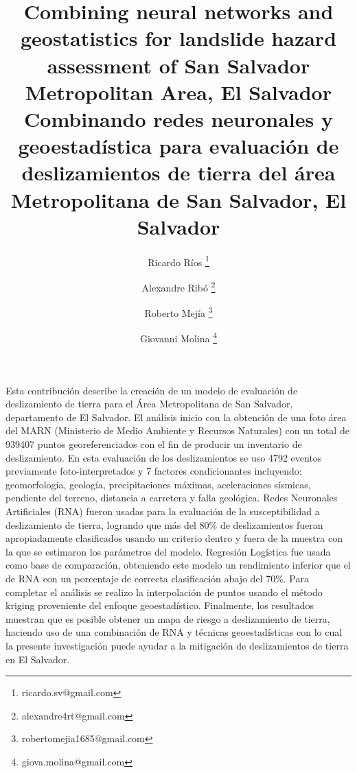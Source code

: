 \documentclass[11pt,twoside]{rmta2010esp}%
\begin{document}
\title{Combining neural networks and geostatistics for landslide hazard assessment of San Salvador Metropolitan Area, El Salvador 
\newline
\newline
Combinando redes neuronales y geoestad\'{i}stica para evaluaci\'{o}n de deslizamientos de tierra del \'{a}rea Metropolitana de San Salvador, El Salvador}

\author[1]{Ricardo R\'{i}os \thanks{ricardo.sv@gmail.com}}
\author[2]{Alexandre Rib\'{o} \thanks{alexandre4rt@gmail.com}}
\author[3]{Roberto Mej\'{i}a \thanks{robertomejia1685@gmail.com}}
\author[4]{Giovanni Molina \thanks{giova.molina@gmail.com}}




\maketitle



\begin{resumen}
Esta contribuci\'{o}n describe la creaci\'{o}n de un modelo de evaluaci\'{o}n de deslizamiento de tierra para el \'{A}rea Metropolitana de San Salvador, departamento de El Salvador. El an\'{a}lisis inicio con la obtenci\'{o}n de una foto \'{a}rea del MARN (Ministerio de Medio Ambiente y Recursos Naturales) con un total de 939407 puntos georeferenciados con el fin de producir un inventario de deslizamiento. En esta evaluaci\'{o}n de los deslizamientos se uso 4792 eventos previamente foto-interpretados y 7 factores condicionantes incluyendo: geomorfolog\'{i}a, geolog\'{i}a, precipitaciones m\'{a}ximas, aceleraciones s\'{i}smicas, pendiente del terreno, distancia a carretera y falla geol\'{o}gica. Redes Neuronales Artificiales (RNA) fueron usadas para la evaluaci\'{o}n de la susceptibilidad a deslizamiento de tierra, logrando que m\'{a}s del 80\% de deslizamientos fueran apropiadamente clasificados usando un criterio dentro y fuera de la muestra con la que se estimaron los par\'{a}metros del modelo. Regresi\'{o}n Log\'{i}stica fue usada como base de comparaci\'{o}n, obteniendo este modelo un rendimiento inferior que el de RNA con un porcentaje de correcta clasificaci\'{o}n abajo del 70\%. Para completar el an\'{a}lisis se realizo la interpolaci\'{o}n de puntos usando el m\'{e}todo kriging proveniente del enfoque geoestad\'{i}stico. Finalmente, los resultados muestran que es posible obtener un mapa de riesgo a deslizamiento de tierra, haciendo uso de una combinaci\'{o}n de RNA y t\'{e}cnicas geoestad\'{i}sticas con lo cual la presente investigaci\'{o}n puede ayudar a la mitigaci\'{o}n de deslizamientos de tierra en El Salvador.
\end{resumen}
\end{document}
